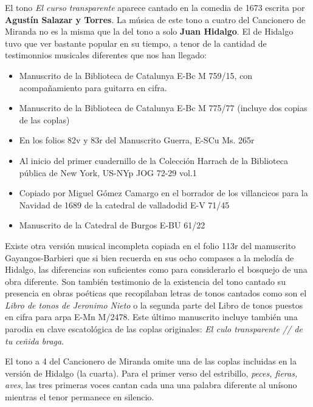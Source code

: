 El tono \textit{El curso transparente} aparece cantado en la comedia de 1673  escrita por \textbf{Agustín Salazar y Torres}. La música de este tono a cuatro del Cancionero de Miranda no es la misma que la del tono a solo \textbf{Juan Hidalgo}. El de Hidalgo tuvo que ver bastante popular en su tiempo, a tenor de la cantidad de testimonnios musicales diferentes que nos han llegado:
\begin{itemize}
	\item Manuscrito de la Biblioteca de Catalunya E-Bc M 759/15, con acompañamiento para guitarra en cifra.
	\item Manuscrito de la Biblioteca de Catalunya E-Bc M 775/77 (incluye dos copias de las coplas) 
	\item En los folios 82v y 83r del Manuscrito Guerra, E-SCu Ms. 265r
	\item Al inicio del primer cuadernillo de la Colección Harrach de la Biblioteca pública de New York, US-NYp JOG 72-29 vol.1
	\item Copiado por Miguel Gómez Camargo en el borrador de los villancicos para la Navidad de 1689 de la catedral de valladodid E-V 71/45
	\item Manuscrito de la Catedral de Burgos E-BU 61/22
\end{itemize}

Existe otra versión musical incompleta copiada en el folio 113r del manuscrito Gayangos-Barbieri que si bien recuerda en sus ocho compases a la melodía de Hidalgo, las diferencias son suficientes como para considerarlo el bosquejo de una obra diferente. Son también testimonio de la existencia del tono cantado su presencia en obras poéticas que recopilaban letras de tonos cantados como son el \textit{Libro de tonos de Jeronimo Nieto} o la segunda parte del Libro de tonos puestos en cifra para arpa E-Mn M/2478. Este último manuscrito incluye también una parodia en clave escatológica de las coplas originales: \textit{El culo transparente // de tu ceñida braga}.

El tono a 4 del Cancionero de Miranda omite una de las coplas incluidas en la versión de Hidalgo (la cuarta). Para el primer verso del estribillo, \textit{peces, fieras, aves}, las tres primeras voces cantan cada una una palabra diferente al unísono mientras el tenor permanece en silencio.

